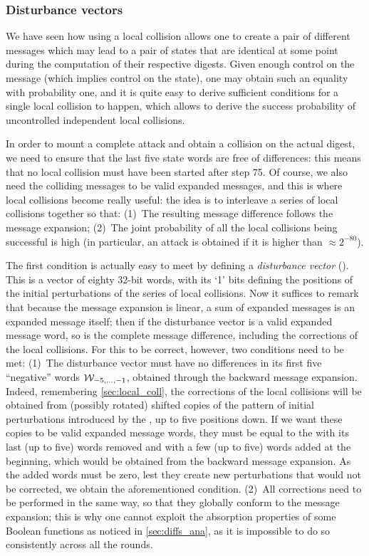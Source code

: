 \subsubsection{Disturbance vectors}
\label{sec:dv_sha0}

We have seen how using a local collision allows one to create a pair of different messages which may lead to a pair of \sha states that are identical at some point during the
computation of their respective digests. Given enough control on the message (which implies control on the state), one may obtain such an equality with probability one, and it is quite easy to derive sufficient conditions
for a single local collision to happen, which allows to derive the success probability of uncontrolled independent local collisions.

In order to mount a complete attack and obtain a collision on the actual digest, we need to ensure that the last five state words are free of differences: this means that no local collision
must have been started after step 75. Of course, we also need the colliding messages to be valid expanded messages, and this is where local collisions become really useful: the idea is to
interleave a series of local collisions together so that: (1)~The resulting message difference follows the message expansion; (2)~The joint probability of all the local collisions being successful
is high (in particular, an attack is obtained if it is higher than $\approx 2^{-80}$).

The first condition is actually easy to meet by defining a \emph{disturbance vector} (\dv). This is a vector of eighty 32-bit words, with its `1' bits defining the positions of the initial perturbations of the series
of local collisions.
Now it suffices to remark that because the message expansion is linear, a sum of expanded messages is an expanded message itself;
then if the disturbance vector is a valid expanded message word, so is the complete message difference, including the corrections of the local
collisions. For this to be correct, however, two conditions need to be met: (1)~The disturbance vector must have no differences in its first five ``negative'' words $\mathcal{W}_{-5,\ldots,-1}$, obtained through
the backward message expansion. Indeed, remembering \autoref{sec:local_coll}, the corrections of the local collisions will be obtained from (possibly rotated) shifted copies of the pattern of initial perturbations introduced by the \dv,
up to five positions down. If we want these copies to be valid expanded message words, they must be equal to the \dv with its last (up to five) words removed and with a few (up to five) words
added at the beginning, which would be obtained from the backward message expansion. As the added words must be zero, lest they create new perturbations that would not be corrected, we obtain the aforementioned
condition. (2)~All corrections need to be performed in the same way, so that they globally conform to the message expansion; this is why one cannot exploit the absorption properties of some Boolean functions as noticed in \autoref{sec:diffs_ana},
as it is impossible to do so consistently across all the rounds.

